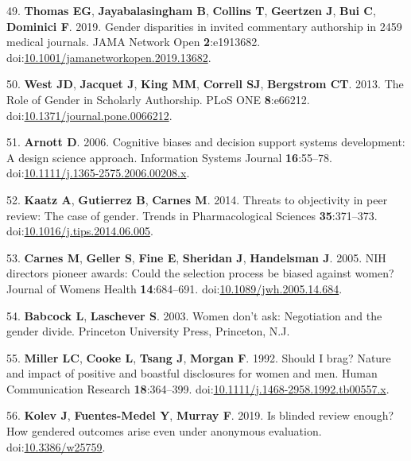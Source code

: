 \documentclass[11pt,]{article}
\begin{document}
\hypertarget{ref-Thomas2019}{}
49. \textbf{Thomas EG}, \textbf{Jayabalasingham B}, \textbf{Collins T},
\textbf{Geertzen J}, \textbf{Bui C}, \textbf{Dominici F}. 2019. Gender
disparities in invited commentary authorship in 2459 medical journals.
JAMA Network Open \textbf{2}:e1913682.
doi:\href{https://doi.org/10.1001/jamanetworkopen.2019.13682}{10.1001/jamanetworkopen.2019.13682}.

\hypertarget{ref-west_role_2013}{}
50. \textbf{West JD}, \textbf{Jacquet J}, \textbf{King MM},
\textbf{Correll SJ}, \textbf{Bergstrom CT}. 2013. The Role of Gender in
Scholarly Authorship. PLoS ONE \textbf{8}:e66212.
doi:\href{https://doi.org/10.1371/journal.pone.0066212}{10.1371/journal.pone.0066212}.

\hypertarget{ref-Arnott2006}{}
51. \textbf{Arnott D}. 2006. Cognitive biases and decision support
systems development: A design science approach. Information Systems
Journal \textbf{16}:55--78.
doi:\href{https://doi.org/10.1111/j.1365-2575.2006.00208.x}{10.1111/j.1365-2575.2006.00208.x}.

\hypertarget{ref-Kaatz2014}{}
52. \textbf{Kaatz A}, \textbf{Gutierrez B}, \textbf{Carnes M}. 2014.
Threats to objectivity in peer review: The case of gender. Trends in
Pharmacological Sciences \textbf{35}:371--373.
doi:\href{https://doi.org/10.1016/j.tips.2014.06.005}{10.1016/j.tips.2014.06.005}.

\hypertarget{ref-Carnes2005}{}
53. \textbf{Carnes M}, \textbf{Geller S}, \textbf{Fine E},
\textbf{Sheridan J}, \textbf{Handelsman J}. 2005. NIH directors pioneer
awards: Could the selection process be biased against women? Journal of
Womens Health \textbf{14}:684--691.
doi:\href{https://doi.org/10.1089/jwh.2005.14.684}{10.1089/jwh.2005.14.684}.

\hypertarget{ref-babcock_women_2003}{}
54. \textbf{Babcock L}, \textbf{Laschever S}. 2003. Women don't ask:
Negotiation and the gender divide. Princeton University Press,
Princeton, N.J.

\hypertarget{ref-MILLER1992}{}
55. \textbf{Miller LC}, \textbf{Cooke L}, \textbf{Tsang J},
\textbf{Morgan F}. 1992. Should I brag? Nature and impact of positive
and boastful disclosures for women and men. Human Communication Research
\textbf{18}:364--399.
doi:\href{https://doi.org/10.1111/j.1468-2958.1992.tb00557.x}{10.1111/j.1468-2958.1992.tb00557.x}.

\hypertarget{ref-Kolev2019}{}
56. \textbf{Kolev J}, \textbf{Fuentes-Medel Y}, \textbf{Murray F}. 2019.
Is blinded review enough? How gendered outcomes arise even under
anonymous evaluation.
doi:\href{https://doi.org/10.3386/w25759}{10.3386/w25759}.
\end{document}
